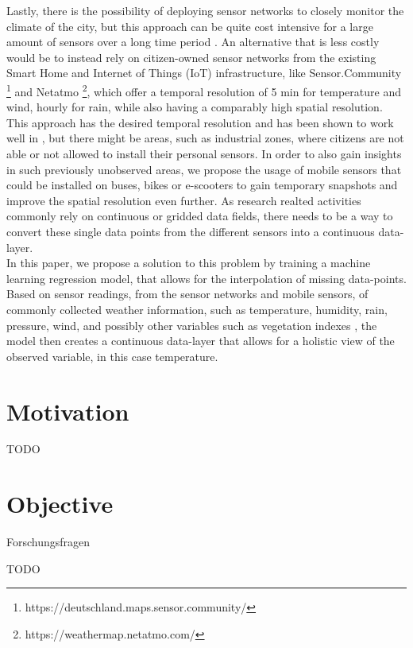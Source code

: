 Lastly, there is the possibility of deploying sensor networks to closely monitor the climate of the city, but this approach can be quite cost intensive for a large amount of sensors over a long time period \cite{chapman2015birmingham}. An alternative that is less costly would be to instead rely on citizen-owned sensor networks from the existing Smart Home and Internet of Things (IoT) infrastructure, like Sensor.Community \footnote{https://deutschland.maps.sensor.community/} and Netatmo \footnote{https://weathermap.netatmo.com/}, which offer a temporal resolution of 5 min for temperature and wind, hourly for rain, while also having a comparably high spatial resolution. This approach has the desired temporal resolution and has been shown to work well in \cite{meier2017crowdsourcing}, but there might be areas, such as industrial zones, where citizens are not able or not allowed to install their personal sensors. In order to also gain insights in such previously unobserved areas, we propose the usage of mobile sensors that could be installed on buses, bikes or e-scooters to gain temporary snapshots and improve the spatial resolution even further.
As research realted activities commonly rely on continuous or gridded data fields, there needs to be a way to convert these single data points from the different sensors into a continuous data-layer.\\
In this paper, we propose a solution to this problem by training a machine learning regression model, that allows for the interpolation of missing data-points. Based on sensor readings, from the sensor networks and mobile sensors, of commonly collected weather information, such as temperature, humidity, rain, pressure, wind, and possibly other variables such as vegetation indexes \cite{alonso2020new}, the model then creates a continuous data-layer that allows for a holistic view of the observed variable, in this case temperature.\\


\section{Motivation}
\label{ch:1}

TODO

\section{Objective}

Forschungsfragen

TODO

